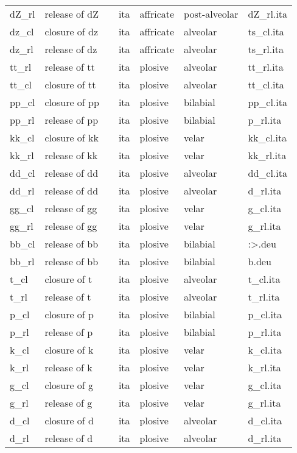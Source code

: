 \begin{longtable}{l|l|l|l|l|l|l}
dZ\_rl	& release of dZ	& 	& ita	& affricate	& post-alveolar	& dZ\_rl.ita\\
dz\_cl	& closure of dz	& 	& ita	& affricate	& alveolar	& ts\_cl.ita\\
dz\_rl	& release of dz	& 	& ita	& affricate	& alveolar	& ts\_rl.ita\\
tt\_rl	& release of tt	& 	& ita	& plosive	& alveolar	& tt\_rl.ita\\
tt\_cl	& closure of tt	& 	& ita	& plosive	& alveolar	& tt\_cl.ita\\
pp\_cl	& closure of pp	& 	& ita	& plosive	& bilabial	& pp\_cl.ita\\
pp\_rl	& release of pp	& 	& ita	& plosive	& bilabial	& p\_rl.ita\\
kk\_cl	& closure of kk	& 	& ita	& plosive	& velar	& kk\_cl.ita\\
kk\_rl	& release of kk	& 	& ita	& plosive	& velar	& kk\_rl.ita\\
dd\_cl	& release of dd	& 	& ita	& plosive	& alveolar	& dd\_cl.ita\\
dd\_rl	& release of dd	& 	& ita	& plosive	& alveolar	& d\_rl.ita\\
gg\_cl	& release of gg	& 	& ita	& plosive	& velar	& g\_cl.ita\\
gg\_rl	& release of gg	& 	& ita	& plosive	& velar	& g\_rl.ita\\
bb\_cl	& release of bb	& 	& ita	& plosive	& bilabial	& \textlessp:\textgreater.deu\\
bb\_rl	& release of bb	& 	& ita	& plosive	& bilabial	& b.deu\\
t\_cl	& closure of t	& 	& ita	& plosive	& alveolar	& t\_cl.ita\\
t\_rl	& release of t	& 	& ita	& plosive	& alveolar	& t\_rl.ita\\
p\_cl	& closure of p	& 	& ita	& plosive	& bilabial	& p\_cl.ita\\
p\_rl	& release of p	& 	& ita	& plosive	& bilabial	& p\_rl.ita\\
k\_cl	& closure of k	& 	& ita	& plosive	& velar	& k\_cl.ita\\
k\_rl	& release of k	& 	& ita	& plosive	& velar	& k\_rl.ita\\
g\_cl	& closure of g	& 	& ita	& plosive	& velar	& g\_cl.ita\\
g\_rl	& release of g	& 	& ita	& plosive	& velar	& g\_rl.ita\\
d\_cl	& closure of d	& 	& ita	& plosive	& alveolar	& d\_cl.ita\\
d\_rl	& release of d	& 	& ita	& plosive	& alveolar	& d\_rl.ita\\

\end{longtable}
